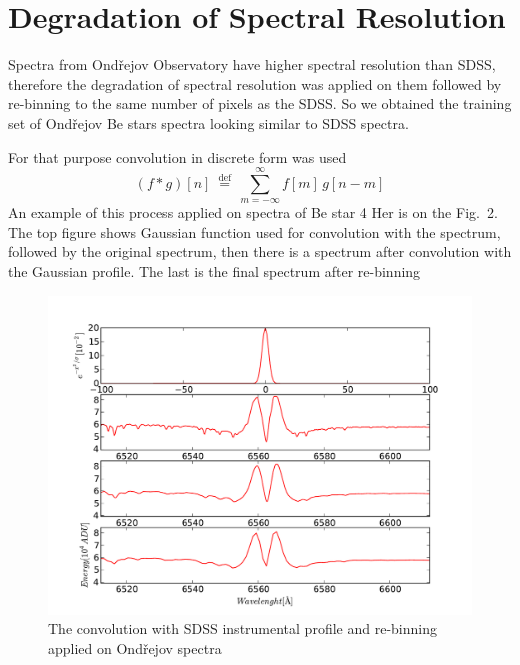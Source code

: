 \documentclass[11pt,twoside]{article}
\begin{document}
\section{Degradation of Spectral Resolution}

Spectra from Ond\v{r}ejov Observatory have higher spectral resolution
than SDSS, therefore the degradation of spectral resolution was
applied on them followed by re-binning to the same number of pixels as the
SDSS. So we obtained the training set of Ond\v{r}ejov Be stars spectra looking
similar to  SDSS spectra.

For that purpose convolution in discrete form was used
%
\begin{equation}
  \label{eq:discreteConvolution}
  (f * g)[n]\ \stackrel{\mathrm{def}}{=}\ \sum_{m=-\infty}^{\infty} f[m]\, g[n - m]
\end{equation}
%
An example of this process applied on spectra of Be star 4 Her is on the
Fig.~2. The top figure shows Gaussian function used for convolution
with the spectrum, followed by the original spectrum, then there is a
spectrum after convolution with the Gaussian profile. The last is the
final spectrum after re-binning


\begin{center}
\begin{figure}[!htbp]
  \begin{center}
    \leavevmode
    \includegraphics[scale = .6]{convolution}
    \caption{The convolution with SDSS instrumental profile and re-binning applied on Ond\v{r}ejov spectra}
    \label{FigConvolution}
  \end{center}
\end{figure}

\end{center}
%
\end{document}
